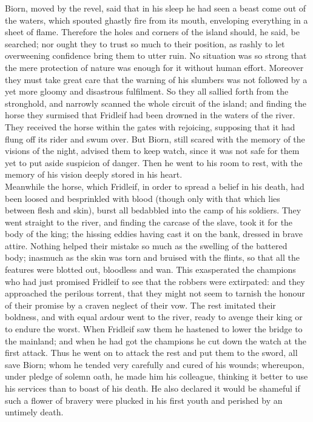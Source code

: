 \documentclass[10pt,a4paper]{report}
\begin{document}
Biorn, moved by the revel, said that in his sleep he had seen a beast come out of the waters, which spouted ghastly fire from its mouth, enveloping everything in a sheet of flame. Therefore the holes and corners of the island should, he said, be searched; nor ought they to trust so much to their position, as rashly to let overweening confidence bring them to utter ruin. No situation was so strong that the mere protection of nature was enough for it without human effort. Moreover they must take great care that the warning of his slumbers was not followed by a yet more gloomy and disastrous fulfilment. So they all sallied forth from the stronghold, and narrowly scanned the whole circuit of the island; and finding the horse they surmised that Fridleif had been drowned in the waters of the river. They received the horse within the gates with rejoicing, supposing that it had flung off its rider and swum over. But Biorn, still scared with the memory of the visions of the night, advised them to keep watch, since it was not safe for them yet to put aside suspicion of danger. Then he went to his room to rest, with the memory of his vision deeply stored in his heart.\\

Meanwhile the horse, which Fridleif, in order to spread a belief in his death, had been loosed and besprinkled with blood (though only with that which lies between flesh and skin), burst all bedabbled into the camp of his soldiers. They went straight to the river, and finding the carcase of the slave, took it for the body of the king; the hissing eddies having cast it on the bank, dressed in brave attire. Nothing helped their mistake so much as the swelling of the battered body; inasmuch as the skin was torn and bruised with the flints, so that all the features were blotted out, bloodless and wan. This exasperated the champions who had just promised Fridleif to see that the robbers were extirpated: and they approached the perilous torrent, that they might not seem to tarnish the honour of their promise by a craven neglect of their vow. The rest imitated their boldness, and with equal ardour went to the river, ready to avenge their king or to endure the worst. When Fridleif saw them he hastened to lower the bridge to the mainland; and when he had got the champions he cut down the watch at the first attack. Thus he went on to attack the rest and put them to the sword, all save Biorn; whom he tended very carefully and cured of his wounds; whereupon, under pledge of solemn oath, he made him his colleague, thinking it better to use his services than to boast of his death. He also declared it would be shameful if such a flower of bravery were plucked in his first youth and perished by an untimely death.\\
\end{document}
